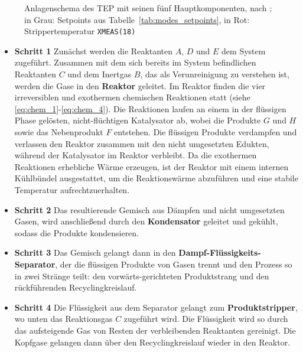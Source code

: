 %
\begin{figure}[tbp]
    \centering
    
    \caption{Anlagenschema des \ac{TEP} mit seinen fünf Hauptkomponenten, nach \cite{downs.1993}; in Grau: Setpoints aus Tabelle~\ref{tab:modes_setpoints}, in Rot: Strippertemperatur \texttt{XMEAS(18)}}
    \label{fig:tep_pid}
\end{figure}
%
\begin{itemize}
    \item \textbf{Schritt 1} \newline 
    Zunächst werden die Reaktanten $A$, $D$ und $E$ dem System zugeführt. Zusammen mit dem sich bereits im System befindlichen Reaktanten $C$ und dem Inertgas $B$, das als Verunreinigung zu verstehen ist, werden die Gase in den \textbf{Reaktor} geleitet. Im Reaktor finden die vier irreversiblen und exothermen chemischen Reaktionen statt (siehe \eqref{eq:chem_1}-\eqref{eq:chem_4}). 
    Die Reaktionen laufen an einem in der flüssigen Phase gelösten, nicht-flüchtigen Katalysator ab, wobei die Produkte $G$ und $H$ sowie das Nebenprodukt $F$ entstehen. Die flüssigen Produkte verdampfen und verlassen den Reaktor zusammen mit den nicht umgesetzten Edukten, während der Katalysator im Reaktor verbleibt. Da die exothermen Reaktionen erhebliche Wärme erzeugen, ist der Reaktor mit einem internen Kühlbündel ausgestattet, um die Reaktionswärme abzuführen und eine stabile  Temperatur aufrechtzuerhalten.
    \item \textbf{Schritt 2} \newline 
    Das resultierende Gemisch aus Dämpfen und nicht umgesetzten Gasen, wird anschließend durch den \textbf{Kondensator} geleitet und gekühlt, sodass die Produkte kondensieren.
    \item \textbf{Schritt 3} \newline
    Das Gemisch gelangt dann in den \textbf{Dampf-Flüssigkeits-Separator}, der die flüssigen Produkte von Gasen trennt und  den Prozess so in zwei Stränge teilt: den vorwärts-gerichteten Produktstrang und den rückführenden Recyclingkreislauf.
    \item \textbf{Schritt 4} \newline
    Die Flüssigkeit aus dem Separator gelangt zum \textbf{Produktstripper}, wo unten das Reaktionsgas $C$ zugeführt wird. Die Flüssigkeit wird so durch das aufsteigende Gas von Resten der verbleibenden Reaktanten gereinigt. Die Kopfgase gelangen dann über den Recyclingkreislauf wieder in den Reaktor.

\end{itemize}
